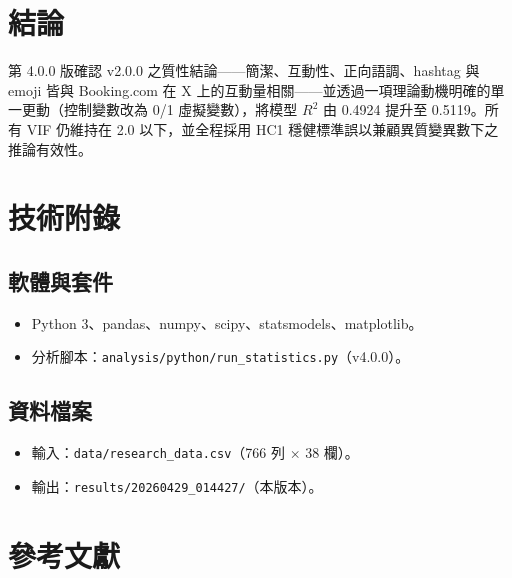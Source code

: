 \documentclass[12pt,a4paper]{ctexart}
\begin{document}
\section{結論}

第 4.0.0 版確認 v2.0.0 之質性結論——簡潔、互動性、正向語調、hashtag 與 emoji 皆與 Booking.com 在 X 上的互動量相關——並透過一項理論動機明確的單一更動（控制變數改為 0/1 虛擬變數），將模型 $R^2$ 由 0.4924 提升至 0.5119。所有 VIF 仍維持在 2.0 以下，並全程採用 HC1 穩健標準誤以兼顧異質變異數下之推論有效性。

\appendix
\section{技術附錄}

\subsection{軟體與套件}
\begin{itemize}
    \item Python 3、pandas、numpy、scipy、statsmodels、matplotlib。
    \item 分析腳本：\texttt{analysis/python/run\_statistics.py}（v4.0.0）。
\end{itemize}

\subsection{資料檔案}
\begin{itemize}
    \item 輸入：\texttt{data/research\_data.csv}（766 列 $\times$ 38 欄）。
    \item 輸出：\texttt{results/20260429\_014427/}（本版本）。
\end{itemize}

\section*{參考文獻}
\end{document}
